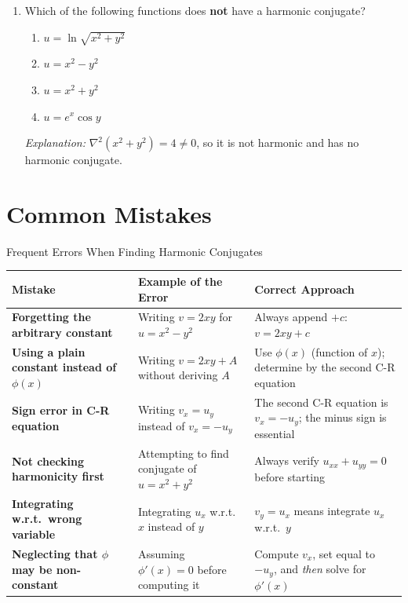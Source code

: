 \documentclass[12pt,a4paper]{article}
\begin{document}
\begin{enumerate}[label=\textbf{MCQ\arabic*.}]
\item Which of the following functions does \textbf{not} have a harmonic conjugate?
      \begin{enumerate}[label=(\alph*)]
        \item $u=\ln\sqrt{x^2+y^2}$
        \item $u=x^2-y^2$
        \item \textbf{$u=x^2+y^2$}
        \item $u=e^x\cos y$
      \end{enumerate}
      \textit{Explanation:} $\nabla^2(x^2+y^2)=4\neq0$, so it is not harmonic and has no
      harmonic conjugate.

\end{enumerate}

\section{Common Mistakes}

\begin{mistakebox}{Frequent Errors When Finding Harmonic Conjugates}
\begin{tabular}{@{}>{\bfseries}p{4cm} p{5cm} p{5cm}@{}}
\toprule
Mistake & Example of the Error & Correct Approach \\
\midrule
Forgetting the arbitrary constant &
  Writing $v=2xy$ for $u=x^2-y^2$ &
  Always append $+c$: $v=2xy+c$ \\
\midrule
Using a plain constant instead of $\phi(x)$ &
  Writing $v=2xy+A$ without deriving $A$ &
  Use $\phi(x)$ (function of $x$); determine by the second C-R equation \\
\midrule
Sign error in C-R equation &
  Writing $v_x=u_y$ instead of $v_x=-u_y$ &
  The second C-R equation is $v_x=-u_y$; the minus sign is essential \\
\midrule
Not checking harmonicity first &
  Attempting to find conjugate of $u=x^2+y^2$ &
  Always verify $u_{xx}+u_{yy}=0$ before starting \\
\midrule
Integrating w.r.t.\ wrong variable &
  Integrating $u_x$ w.r.t.\ $x$ instead of $y$ &
  $v_y=u_x$ means integrate $u_x$ w.r.t.\ $y$ \\
\midrule
Neglecting that $\phi$ may be non-constant &
  Assuming $\phi'(x)=0$ before computing it &
  Compute $v_x$, set equal to $-u_y$, and \emph{then} solve for $\phi'(x)$ \\
\bottomrule
\end{tabular}
\end{mistakebox}
\end{document}
